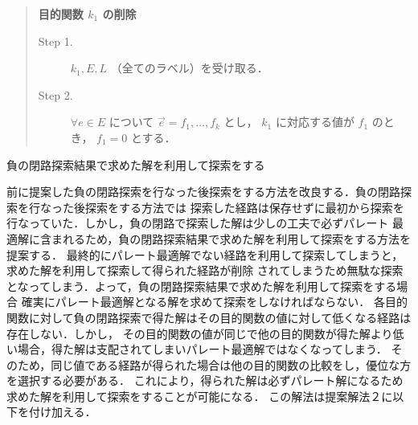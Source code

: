 \documentclass[12pt]{optlab-bachelor}
\begin{document}
\begin{quote}
  \textbf{目的関数 $k_1$ の削除}
  \begin{description}
    \item[Step 1.] $k_1,E,L$ （全てのラベル）を受け取る．
    \item[Step 2.] $\forall e \in E$ について $\vec{e}={f_1,\ldots,f_k}$ とし， $k_1$ に対応する値が
    $f_1$ のとき， $f_1=0$ とする．
  \end{description}
\end{quote}

\begin{description}
  \item[負の閉路探索結果で求めた解を利用して探索をする]
\end{description}

前に提案した負の閉路探索を行なった後探索をする方法を改良する．負の閉路探索を行なった後探索をする方法では
探索した経路は保存せずに最初から探索を行なっていた．しかし，負の閉路で探索した解は少しの工夫で必ずパレート
最適解に含まれるため，負の閉路探索結果で求めた解を利用して探索をする方法を提案する．
最終的にパレート最適解でない経路を利用して探索してしまうと，求めた解を利用して探索して得られた経路が削除
されてしまうため無駄な探索となってしまう．よって，負の閉路探索結果で求めた解を利用して探索をする場合
確実にパレート最適解となる解を求めて探索をしなければならない．
各目的関数に対して負の閉路探索で得た解はその目的関数の値に対して低くなる経路は存在しない．しかし，
その目的関数の値が同じで他の目的関数が得た解より低い場合，得た解は支配されてしまいパレート最適解ではなくなってしまう．
そのため，同じ値である経路が得られた場合は他の目的関数の比較をし，優位な方を選択する必要がある．
これにより，得られた解は必ずパレート解になるため求めた解を利用して探索をすることが可能になる．
この解法は提案解法２に以下を付け加える．
\end{document}
